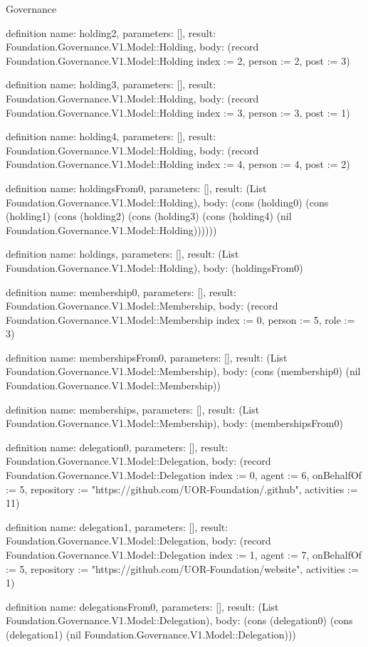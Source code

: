 \begin{lexlean}{Governance}
\begin{semanticmodule}
definition{
  name: holding2,
  parameters: [],
  result: Foundation.Governance.V1.Model::Holding,
  body: (record Foundation.Governance.V1.Model::Holding {index := 2, person := 2, post := 3})
}

definition{
  name: holding3,
  parameters: [],
  result: Foundation.Governance.V1.Model::Holding,
  body: (record Foundation.Governance.V1.Model::Holding {index := 3, person := 3, post := 1})
}

definition{
  name: holding4,
  parameters: [],
  result: Foundation.Governance.V1.Model::Holding,
  body: (record Foundation.Governance.V1.Model::Holding {index := 4, person := 4, post := 2})
}

definition{
  name: holdingsFrom0,
  parameters: [],
  result: (List Foundation.Governance.V1.Model::Holding),
  body: (cons (holding0) (cons (holding1) (cons (holding2) (cons (holding3) (cons (holding4) (nil Foundation.Governance.V1.Model::Holding))))))
}

definition{
  name: holdings,
  parameters: [],
  result: (List Foundation.Governance.V1.Model::Holding),
  body: (holdingsFrom0)
}

definition{
  name: membership0,
  parameters: [],
  result: Foundation.Governance.V1.Model::Membership,
  body: (record Foundation.Governance.V1.Model::Membership {index := 0, person := 5, role := 3})
}

definition{
  name: membershipsFrom0,
  parameters: [],
  result: (List Foundation.Governance.V1.Model::Membership),
  body: (cons (membership0) (nil Foundation.Governance.V1.Model::Membership))
}

definition{
  name: memberships,
  parameters: [],
  result: (List Foundation.Governance.V1.Model::Membership),
  body: (membershipsFrom0)
}

definition{
  name: delegation0,
  parameters: [],
  result: Foundation.Governance.V1.Model::Delegation,
  body: (record Foundation.Governance.V1.Model::Delegation {index := 0, agent := 6, onBehalfOf := 5, repository := "https://github.com/UOR-Foundation/.github", activities := 11})
}

definition{
  name: delegation1,
  parameters: [],
  result: Foundation.Governance.V1.Model::Delegation,
  body: (record Foundation.Governance.V1.Model::Delegation {index := 1, agent := 7, onBehalfOf := 5, repository := "https://github.com/UOR-Foundation/website", activities := 1})
}

definition{
  name: delegationsFrom0,
  parameters: [],
  result: (List Foundation.Governance.V1.Model::Delegation),
  body: (cons (delegation0) (cons (delegation1) (nil Foundation.Governance.V1.Model::Delegation)))
}


\end{semanticmodule}
\end{lexlean}
